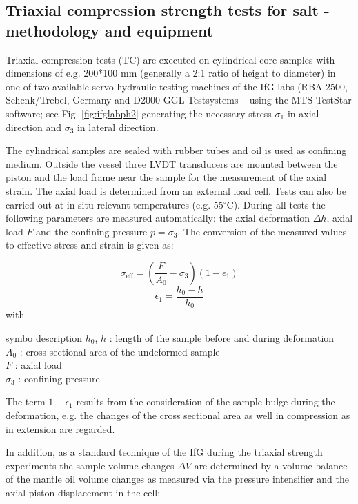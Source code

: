 \subsection{Triaxial compression strength tests for salt - methodology and equipment}

Triaxial compression tests (TC) are executed on cylindrical core samples with dimensions of e.g. 200*100 mm (generally a 2:1 ratio of height to diameter) in one of two available servo-hydraulic testing machines of the IfG labs (RBA 2500, Schenk/Trebel, Germany and D2000 GGL Testsystems – using the MTS-TestStar software; see Fig. \ref{fig:ifglabph2} generating the necessary stress $\sigma_1$ in axial direction and $\sigma_3$ in lateral direction.

The cylindrical samples are sealed with rubber tubes and oil is used as confining medium. Outside the vessel three LVDT transducers are mounted between the piston and the load frame near the sample for the measurement of the axial strain. The axial load is determined from an external load cell. Tests can also be carried out at in-situ relevant temperatures (e.g. 55$^\circ$C). During all tests the following parameters are measured automatically: the axial deformation $\Delta h$, axial load $F$ and the confining pressure $p = \sigma_3$. The conversion of the measured values to effective stress and strain is given as:

\begin{equation}
\sigma_\text{eff} = \left(\frac{F}{A_0}-\sigma_3 \right) (1-\epsilon_1)
\end{equation}
\begin{equation}
\epsilon_1 = \frac{h_0-h}{h_0}
\end{equation}
with
\begin{tabbing}
symbo \= description \kill
$h_0$, $h$ : \> length of the sample before and during deformation \\
$A_0$ : \> cross sectional area of the undeformed sample \\
$F$ : \> axial load  \\
$\sigma_3$ : \> confining pressure 
\end{tabbing}

The term $1-\epsilon_1$ results from the consideration of the sample bulge during the deformation, e.g. the changes of the cross sectional area as well in compression as in extension are regarded.

In addition, as a standard technique of the IfG during the triaxial strength experiments the sample volume changes $\Delta V$ are determined by a volume balance of the mantle oil volume changes as measured via the pressure intensifier and the axial piston displacement in the cell:

